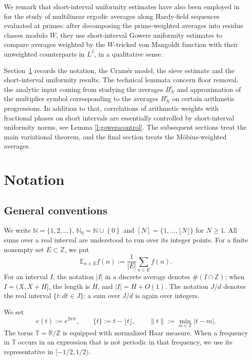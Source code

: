\documentclass[10pt,leqno]{amsart}
\def\N {\mathbb{N}}
\newcounter{counter}
\newcounter{counter2}
\numberwithin{equation}{section}
\numberwithin{counter2}{section}
\theoremstyle{definition}
\theoremstyle{plain}
\begin{document}
    We remark that short-interval uniformity estimates have also been employed in \cite{KoutsogiannisTsinas2026} for the study of multilinear ergodic averages along Hardy-field sequences evaluated at primes: after decomposing the prime-weighted averages into residue classes modulo $W$, they use short-interval Gowers uniformity estimates to compare averages weighted by the $W$-tricked von Mangoldt function with their unweighted counterparts in $L^2$, in a qualitative sense. 
	
	Section~\ref{sec:notation} records the notation, the Cram\'er model,
	the sieve estimate and the short-interval uniformity results.
	The technical lemmata concern floor removal, the analytic input coming from studying the averages $B_N^c$
	and approximation of the multiplier symbol corresponding to the averages  $B_N^c$ on certain arithmetic progressions. In addition to that,
	correlations of arithmetic weights with fractional phases on short intervals are essentially controlled by short-interval uniformity norms, see Lemma
	\ref{l:gowerscontrol}.  The subsequent sections treat
	the main variational theorem, and the final section treats the
	M\"obius-weighted averages.
	
	
	\section{Notation}\label{sec:notation}
	
	\subsection{General conventions}
	
	We write $\N=\{1,2,\ldots\}$,\;
	$\N_0=\N \cup \left\{ 0 \right\} $ and
	$[N]=\{1,\ldots,\lfloor N\rfloor\}$ for $N\ge1$.
	All sums over a real interval are understood to run over its integer
	points. For a finite nonempty set $E\subset\mathbb Z$, we put
	\[
	\mathbb E_{n\in E}f(n):=\frac1{|E|}\sum_{n\in E}f(n).
	\]
	For an interval $I$, the notation $|I|$ in a discrete average
	denotes $\#(I\cap\mathbb Z)$; when $I=(X,X+H]$, the length
	is $H$, and $|I|=H+O(1)$. The notation $J/d$ denotes the real
	interval $\{t:dt\in J\}$; a sum over $J/d$ is again over integers.
	
	We set
	\[
	e(t):=e^{2\pi i t},\qquad
	\{t\}:=t-\lfloor t\rfloor,\qquad
	\|t\|:=\min_{m\in\mathbb Z}|t-m|.
	\]
	The torus $\mathbb T=\mathbb R/\mathbb Z$ is equipped with
	normalized Haar measure. When a frequency in $\mathbb T$ occurs
	in an expression that is not periodic in that frequency, we use its
	representative in $[-1/2,1/2)$. 
	
\end{document}
